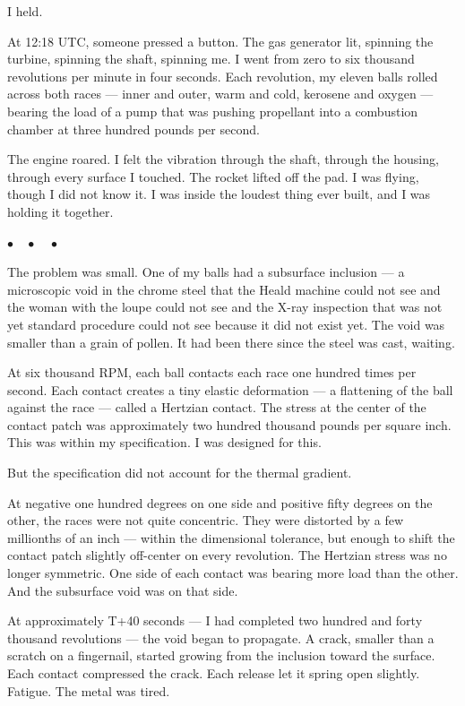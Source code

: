 \documentclass[12pt, letterpaper]{article}
\begin{document}
I held.

At 12:18 UTC, someone pressed a button. The gas generator lit, spinning the turbine, spinning the shaft, spinning me. I went from zero to six thousand revolutions per minute in four seconds. Each revolution, my eleven balls rolled across both races --- inner and outer, warm and cold, kerosene and oxygen --- bearing the load of a pump that was pushing propellant into a combustion chamber at three hundred pounds per second.

The engine roared. I felt the vibration through the shaft, through the housing, through every surface I touched. The rocket lifted off the pad. I was flying, though I did not know it. I was inside the loudest thing ever built, and I was holding it together.

\begin{center}
$\bullet\quad\bullet\quad\bullet$
\end{center}

The problem was small. One of my balls had a subsurface inclusion --- a microscopic void in the chrome steel that the Heald machine could not see and the woman with the loupe could not see and the X-ray inspection that was not yet standard procedure could not see because it did not exist yet. The void was smaller than a grain of pollen. It had been there since the steel was cast, waiting.

At six thousand RPM, each ball contacts each race one hundred times per second. Each contact creates a tiny elastic deformation --- a flattening of the ball against the race --- called a Hertzian contact. The stress at the center of the contact patch was approximately two hundred thousand pounds per square inch. This was within my specification. I was designed for this.

But the specification did not account for the thermal gradient.

At negative one hundred degrees on one side and positive fifty degrees on the other, the races were not quite concentric. They were distorted by a few millionths of an inch --- within the dimensional tolerance, but enough to shift the contact patch slightly off-center on every revolution. The Hertzian stress was no longer symmetric. One side of each contact was bearing more load than the other. And the subsurface void was on that side.

At approximately T+40 seconds --- I had completed two hundred and forty thousand revolutions --- the void began to propagate. A crack, smaller than a scratch on a fingernail, started growing from the inclusion toward the surface. Each contact compressed the crack. Each release let it spring open slightly. Fatigue. The metal was tired.
\end{document}
